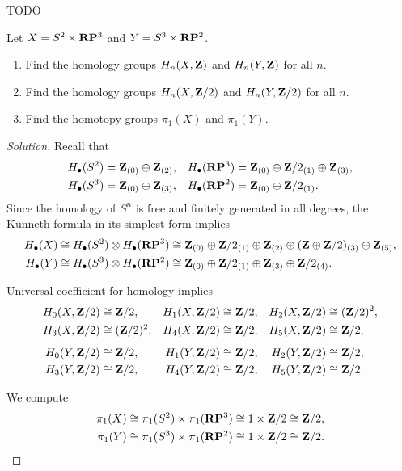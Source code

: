 TODO


Let $X = S^2 \times \mathbf{R}\mathbf{P}^3$ and $Y = S^3 \times \mathbf{R}\mathbf{P}^2$.
\begin{enumerate}
\item Find the homology groups $H_n(X, \mathbf{Z})$ and $H_n(Y, \mathbf{Z})$ for all $n$.
\item Find the homology groups $H_n(X, \mathbf{Z}/2)$ and $H_n(Y, \mathbf{Z}/2)$ for all $n$.
\item Find the homotopy groups $\pi_1(X)$ and $\pi_1(Y)$.
\end{enumerate}

\begin{proof}[Solution]
  Recall that
  \begin{align*}
    H_\bullet(S^2)    &= \mathbf{Z}_{(0)} \oplus \mathbf{Z}_{(2)}, &
    H_\bullet(\mathbf{R}\mathbf{P}^3) &= \mathbf{Z}_{(0)} \oplus \mathbf{Z}/2_{(1)} \oplus \mathbf{Z}_{(3)}, \\
    H_\bullet(S^3)    &= \mathbf{Z}_{(0)} \oplus \mathbf{Z}_{(3)}, &
    H_\bullet(\mathbf{R}\mathbf{P}^2) &= \mathbf{Z}_{(0)} \oplus \mathbf{Z}/2_{(1)}.
  \end{align*}
  Since the homology of $S^n$ is free and finitely generated in all degrees, the K\"unneth formula in its simplest form implies
  \begin{align*}
    H_\bullet(X)
    &\cong
    H_\bullet(S^2) \otimes H_\bullet(\mathbf{R}\mathbf{P}^3) \cong
    \mathbf{Z}_{(0)} \oplus \mathbf{Z}/2_{(1)} \oplus \mathbf{Z}_{(2)} \oplus (\mathbf{Z} \oplus \mathbf{Z}/2)_{(3)} \oplus \mathbf{Z}_{(5)}, \\
    H_\bullet(Y)
    &\cong
    H_\bullet(S^3) \otimes H_\bullet(\mathbf{R}\mathbf{P}^2) \cong
    \mathbf{Z}_{(0)} \oplus \mathbf{Z}/2_{(1)} \oplus \mathbf{Z}_{(3)} \oplus \mathbf{Z}/2_{(4)}.
  \end{align*}
    
  Universal coefficient for homology implies
  \begin{align*}
    H_0(X,\mathbf{Z}/2) &\cong \mathbf{Z}/2, &
    H_1(X,\mathbf{Z}/2) &\cong \mathbf{Z}/2, &
    H_2(X,\mathbf{Z}/2) &\cong (\mathbf{Z}/2)^2, \\
    H_3(X,\mathbf{Z}/2) &\cong (\mathbf{Z}/2)^2, &
    H_4(X,\mathbf{Z}/2) &\cong \mathbf{Z}/2, &
    H_5(X,\mathbf{Z}/2) &\cong \mathbf{Z}/2, \\[5pt]
    H_0(Y,\mathbf{Z}/2) &\cong \mathbf{Z}/2, &
    H_1(Y,\mathbf{Z}/2) &\cong \mathbf{Z}/2, &
    H_2(Y,\mathbf{Z}/2) &\cong \mathbf{Z}/2, \\
    H_3(Y,\mathbf{Z}/2) &\cong \mathbf{Z}/2, &
    H_4(Y,\mathbf{Z}/2) &\cong \mathbf{Z}/2, &
    H_5(Y,\mathbf{Z}/2) &\cong \mathbf{Z}/2.
  \end{align*}
  
  We compute
  \begin{align*}
    \pi_1(X) &\cong
    \pi_1(S^2) \times \pi_1(\mathbf{R}\mathbf{P}^3) \cong
    1 \times \mathbf{Z}/2 \cong
    \mathbf{Z}/2, \\
    \pi_1(Y) &\cong
    \pi_1(S^3) \times \pi_1(\mathbf{R}\mathbf{P}^2) \cong
    1 \times \mathbf{Z}/2 \cong
    \mathbf{Z}/2. \qedhere
  \end{align*}
\end{proof}

